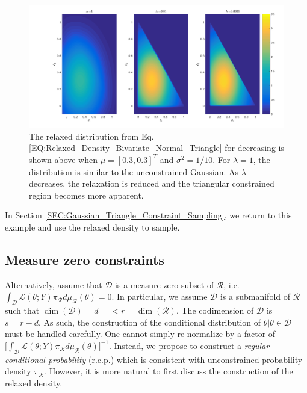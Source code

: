 \documentclass[10pt,fleqn]{article}
\DeclareMathOperator{\1}{\mathbbm{1}}
\begin{document}
\begin{figure}[h!]
\begin{center}
\includegraphics[width=1\textwidth,natwidth=610,natheight=642]{Bivariate_Normal_Triangle_Constraint.jpg}
\end{center}
\caption{The relaxed distribution from Eq. \eqref{EQ:Relaxed_Density_Bivariate_Normal_Triangle} for decreasing is shown above when $\mu = [0.3, 0.3]^T$ and $\sigma^2 = 1/10.$  For $\lambda=1$, the distribution is similar to the unconstrained Gaussian.  As $\lambda$ decreases, the relaxation is reduced and the triangular constrained region becomes more apparent.}
\label{FIG:Bivariate_Normal_Triangle_Constraint_Relaxation}
\end{figure}
In Section \ref{SEC:Gaussian_Triangle_Constraint_Sampling}, we return to this example and use the relaxed density to sample.


\subsection{Measure zero constraints}
\label{SEC:Zero_Measure_Methods}

Alternatively, assume that $\mathcal{D}$ is a measure zero subset of $\mathcal{R}$, i.e. $\int_\mathcal{D}\mathcal{L}(\theta;Y)\pi_\mathcal{R}d\mu_\mathcal{R}(\theta)=0$. In particular, we assume $\mathcal{D}$ is a submanifold of $\mathcal{R}$ such that $\dim(\mathcal{D}) = d= < r =\dim(\mathcal{R})$. The codimension of $\mathcal{D}$ is $s=r-d$. As such, the construction of the conditional distribution of $\theta|\theta \in \mathcal{D}$ must be handled carefully. One cannot simply re-normalize by a factor of $\big[\int_\mathcal{D}\mathcal{L}(\theta;Y)\pi_\mathcal{R}d\mu_\mathcal{R}(\theta)\big]^{-1}.$  Instead, we propose to construct a \emph{regular conditional probability} (r.c.p.) which is consistent with unconstrained probability density $\pi_\mathcal{R}.$  However, it is more natural to first discuss the construction of the relaxed density.
\end{document}
